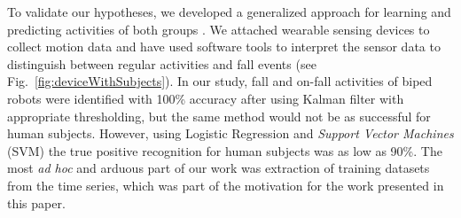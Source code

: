 \documentclass[]{IEEEtran}
\begin{document}
\par
To validate our hypotheses, we developed a generalized approach for learning 
and predicting activities of both groups \cite{abeyruwanFlairs2015}.  We attached wearable sensing devices to collect
motion data and have used software tools to interpret the sensor data to distinguish 
between regular activities and fall events (see Fig.~\ref{fig:deviceWithSubjects}). 
In our study, fall and on-fall activities of biped robots were identified with 100\%  accuracy after using Kalman filter \cite{Welch:1995:IKF:897831} with appropriate thresholding, but the same method would not be as successful for human subjects.  However, using Logistic Regression and \emph{Support Vector Machines} (SVM) the true positive recognition for human subjects was as low as 90\%. The most \emph{ad hoc} and arduous part of our work was extraction of training datasets from the time series, which was part of the motivation for the work presented in this paper.

%



\end{document}
